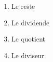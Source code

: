 %
%
    \begin{enumerate}
        \item Le reste
        \item Le dividende
        \item Le quotient
        \item Le diviseur
    \end{enumerate}
